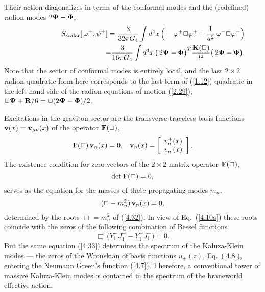 \documentclass[a4paper,preprint,nofootinbib,
                 showpacs,preprintnumbers,amsmath,amssymb]{revtex4}
\begin{document}
Their action diagonalizes in terms of  
the conformal modes and the (redefined) radion modes  
$2{\bf\Psi-\Phi}$, 
    \begin{eqnarray} 
    &&S_{\rm scalar}[\,\varphi^\pm,\psi^\pm] 
    =\frac3{32\pi G_4} \int d^4x\, 
    \Big(-\varphi^+\Box\varphi^+ 
    +\frac1{a^2}\,\varphi^-\Box\varphi^-\Big)\nonumber\\ 
    &&\qquad\qquad\qquad\qquad\qquad\quad 
    -\frac3{16\pi G_4} \int d^4x\, 
    \big(\,2{\bf\Psi}-{\bf\Phi}\big)^T 
    \frac{{\bf K}(\Box)}{l^2} 
    \big(\,2{\bf\Psi}-{\bf\Phi}\big).       \label{4.24a} 
    \end{eqnarray} 
Note that the sector of conformal modes is entirely local, and the 
last $2\times2$ radion quadratic form here corresponds to the last term 
of (\ref{1.12}) quadratic in the left-hand side of the radion equations of  
motion (\ref{2.29}), 
$\Box{\bf\Psi}+{\bf R}/6=\Box(2{\bf\Psi-\Phi})/2$. 
 
Excitations in the graviton sector are the transverse-traceless 
basis functions ${\bf v}(x)={\bf v}_{\mu\nu}(x)$ of the operator  
${\bf F}(\Box)$, 
    \begin{equation} 
    {\bf F}(\Box)\,{\bf v}_n(x)=0,\,\,\,\,\, 
    {\bf v}_n(x)=\left[\begin{array}{c} 
    v^+_n(x)\\ 
    v^-_n(x) 
    \end{array}\right].            \label{4.32b} 
    \end{equation} 
The existence condition for zero-vectors of the $2\times2$  
matrix operator ${\bf F}(\Box)$,  
    \begin{equation} 
    {\rm det}\,{\bf F}(\Box)=0,    \label{4.32} 
    \end{equation} 
serves as the equation for the masses of these propagating modes  
$m_n$, 
    \begin{equation} 
    (\Box-m_n^2)\,{\bf v}_n(x)=0,    \label{4.32a} 
    \end{equation} 
determined by the roots $\Box=m_n^2$ of (\ref{4.32}). In view of  
Eq.~(\ref{4.10a}) these roots coincide with the zeros  
of the following combination of Bessel functions 
    \begin{equation} 
    \Box\,\Big(Y_1^-J_1^+-Y_1^+J_1^-\Big)=0.  \label{4.33} 
    \end{equation} 
But the same equation (\ref{4.33}) determines the 
spectrum of the Kaluza-Klein modes --- the zeros of the Wronskian  
of basis functions $u_\pm(z)$, Eq.~(\ref{4.8}), entering the Neumann 
Green's function (\ref{4.7}). Therefore, a conventional tower of  
massive Kaluza-Klein modes is contained in the spectrum of the braneworld 
effective action. 
 
\end{document}

